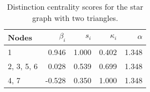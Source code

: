 \begin{table}
\centering
\caption{\label{tab:star2}Distinction centrality scores for the star graph with two triangles.}
\centering
\begin{tabular}[t]{lrrrr}
\toprule
Nodes & $\beta_i$ & $s_i$ & $\kappa_i$ & $\alpha$\\
\midrule
1 & 0.946 & 1.000 & 0.402 & 1.348\\
2, 3, 5, 6 & 0.028 & 0.539 & 0.699 & 1.348\\
4, 7 & -0.528 & 0.350 & 1.000 & 1.348\\
\bottomrule
\end{tabular}
\end{table}
